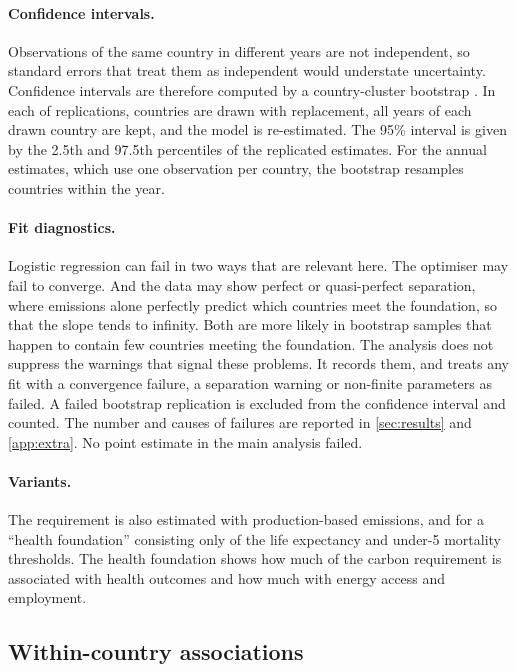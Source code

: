 \paragraph{Confidence intervals.} Observations of the same country in different years are not independent, so standard errors that treat them as independent would understate uncertainty. Confidence intervals are therefore computed by a country-cluster bootstrap \citep{cameron2008}. In each of \nBootReps{} replications, countries are drawn with replacement, all years of each drawn country are kept, and the model is re-estimated. The 95\% interval is given by the 2.5th and 97.5th percentiles of the replicated estimates. For the annual estimates, which use one observation per country, the bootstrap resamples countries within the year.

\paragraph{Fit diagnostics.} Logistic regression can fail in two ways that are relevant here. The optimiser may fail to converge. And the data may show perfect or quasi-perfect separation, where emissions alone perfectly predict which countries meet the foundation, so that the slope tends to infinity. Both are more likely in bootstrap samples that happen to contain few countries meeting the foundation. The analysis does not suppress the warnings that signal these problems. It records them, and treats any fit with a convergence failure, a separation warning or non-finite parameters as failed. A failed bootstrap replication is excluded from the confidence interval and counted. The number and causes of failures are reported in \cref{sec:results} and \cref{app:extra}. No point estimate in the main analysis failed.

\paragraph{Variants.} The requirement is also estimated with production-based emissions, and for a ``health foundation'' consisting only of the life expectancy and under-5 mortality thresholds. The health foundation shows how much of the carbon requirement is associated with health outcomes and how much with energy access and employment.

\subsection{Within-country associations}

